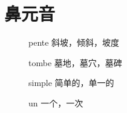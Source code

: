 \section{鼻元音}

\begin{description}
\item[\textipa{[\~a]}] pente \textipa{[p\~at]} 斜坡，倾斜，坡度
\item[\textipa{[\~o]}] tombe \textipa{[t\~ob]} 墓地，墓穴，墓碑
\item[\textipa{[\~e]}] simple \textipa{[s\~epl]} 简单的，单一的
\item[\textipa{[\~\oe]}] un \textipa{[\~\oe]} 一个，一次
\end{description}



